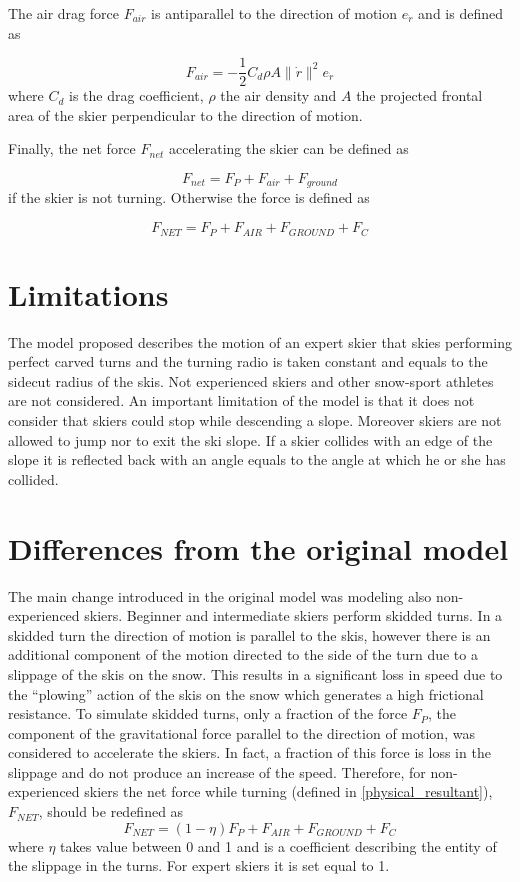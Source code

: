 \documentclass[12pt,a4paper,twoside]{book}
\newcommand{\norm}[1]{\lVert#1\rVert}
\begin{document}
The air drag force $F_{air}$ is antiparallel to the direction of motion $e_{\dot{r}}$ and is defined as

\begin{equation}
F_{air}=-\frac{1}{2}C_d \rho A \norm{\dot{r}}^2 e_{\dot{r}}
\end{equation}
where $C_d$ is the drag coefficient, $\rho$ the air density and $A$ the projected frontal area of the skier perpendicular to the direction of motion.

Finally, the net force $F_{net}$ accelerating the skier can be defined as

\begin{equation}
F_{net}=F_P + F_{air} + F_{ground}
\end{equation}
if the skier is not turning. Otherwise the force is defined as

\begin{equation}\label{physical_resultant}
F_{NET}=F_P + F_{AIR} + F_{GROUND} + F_C
\end{equation}

\section{Limitations}
The model proposed describes the motion of an expert skier that skies performing perfect carved turns and the turning radio is taken constant and equals to the sidecut radius of the skis. Not experienced skiers and other snow-sport athletes are not considered. An important limitation of the model is that it does not consider that skiers could stop while descending a slope.  Moreover skiers are not allowed to jump nor to exit the ski slope. If a skier collides with an edge of the slope it is reflected back with an angle equals to the angle at which he or she has collided.

\section{Differences from the original model}
The main change introduced in the original model was modeling also non-experienced skiers. Beginner and intermediate skiers perform skidded turns. In a skidded turn the direction of motion is parallel to the skis, however there is an additional component of the motion directed to the side of the turn due to a slippage of the skis on the snow. This results in a significant loss in speed due to the ``plowing'' action of the skis on the snow which generates a high frictional resistance. To simulate skidded turns, only a fraction of the force $F_P$, the component of the gravitational force parallel to the direction of motion, was considered to accelerate the skiers. In fact, a fraction of this force is loss in the slippage and do not produce an increase of the speed. Therefore, for non-experienced skiers the net force while turning (defined in \ref{physical_resultant}), $F_{NET}$, should be redefined as
\begin{equation}
F_{NET}=(1-\eta) F_P + F_{AIR} + F_{GROUND} + F_C
\end{equation}
where $\eta$ takes value between 0 and 1 and is a coefficient describing the entity of the slippage in the turns. For expert skiers it is set equal to 1.
\end{document}
